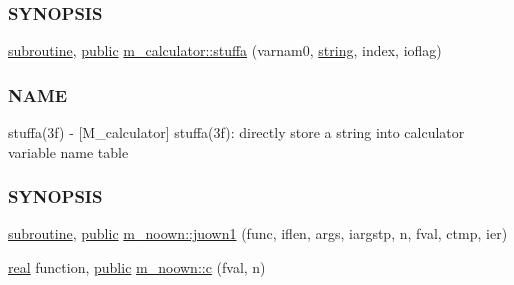 \begin{DoxyCompactItemize}
\begin{DoxyCompactList}
\subsubsection*{S\+Y\+N\+O\+P\+S\+IS}\end{DoxyCompactList}\item 
\hyperlink{M__stopwatch_83_8txt_acfbcff50169d691ff02d4a123ed70482}{subroutine}, \hyperlink{M__stopwatch_83_8txt_a2f74811300c361e53b430611a7d1769f}{public} \hyperlink{namespacem__calculator_ade5ed0d5db38a14b2c521bc268756f39}{m\+\_\+calculator\+::stuffa} (varnam0, \hyperlink{what__overview_81_8txt_a74cb7e955273b9f9157b4f0c18a38849}{string}, index, ioflag)
\begin{DoxyCompactList}\small\item\em \subsubsection*{N\+A\+ME}

stuffa(3f) -\/ \mbox{[}M\+\_\+calculator\mbox{]} stuffa(3f)\+: directly store a string into calculator variable name table \subsubsection*{S\+Y\+N\+O\+P\+S\+IS}\end{DoxyCompactList}\item 
\hyperlink{M__stopwatch_83_8txt_acfbcff50169d691ff02d4a123ed70482}{subroutine}, \hyperlink{M__stopwatch_83_8txt_a2f74811300c361e53b430611a7d1769f}{public} \hyperlink{namespacem__noown_a9621366886f977a10fd7804c91054c6d}{m\+\_\+noown\+::juown1} (func, iflen, args, iargstp, n, fval, ctmp, ier)
\item 
\hyperlink{read__watch_83_8txt_abdb62bde002f38ef75f810d3a905a823}{real} function, \hyperlink{M__stopwatch_83_8txt_a2f74811300c361e53b430611a7d1769f}{public} \hyperlink{namespacem__noown_ad499ba6364622c755e4ad04bc2bfa4a3}{m\+\_\+noown\+::c} (fval, n)
\end{DoxyCompactItemize}
